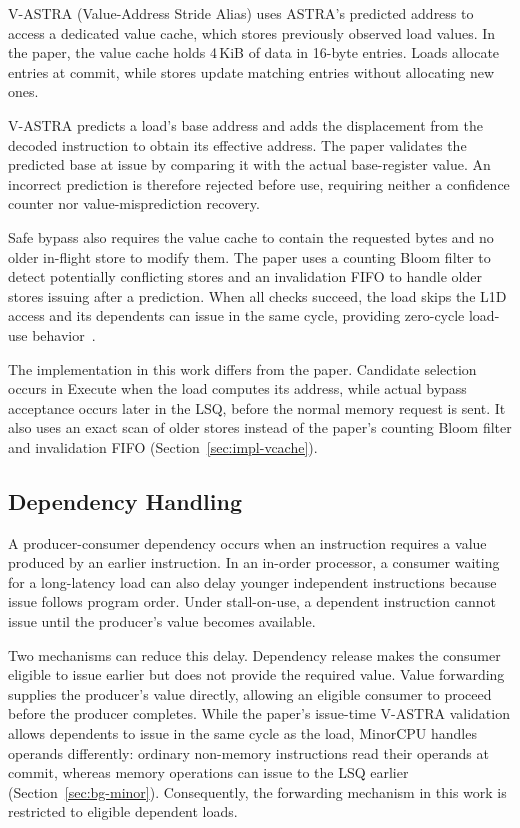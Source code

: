 V-ASTRA (Value-Address Stride Alias) uses ASTRA's predicted address
to access a dedicated value cache, which stores previously
observed load values. In the paper, the value cache holds 4\,KiB of data
in 16-byte entries. Loads allocate entries at commit, while stores
update matching entries without allocating new ones.

V-ASTRA predicts a load's base address and adds the displacement
from the decoded instruction to obtain its effective address.
The paper validates the predicted base at issue by comparing it
with the actual base-register value. An incorrect prediction is
therefore rejected before use, requiring neither a confidence
counter nor value-misprediction recovery.

Safe bypass also requires the value cache to contain the requested
bytes and no older in-flight store to modify them. The paper uses
a counting Bloom filter to detect potentially conflicting stores
and an invalidation FIFO to handle older stores issuing after a
prediction. When all checks succeed, the load skips the L1D access
and its dependents can issue in the same cycle, providing
zero-cycle load-use behavior~\cite{ravenel2025architecting}.

The implementation in this work differs from the paper. Candidate
selection occurs in Execute when the load computes its address,
while actual bypass acceptance occurs later in the LSQ, before
the normal memory request is sent. It also uses an exact scan of
older stores instead of the paper's counting Bloom filter and
invalidation FIFO (Section~\ref{sec:impl-vcache}).

\subsection{Dependency Handling}

A producer-consumer dependency occurs when an instruction requires
a value produced by an earlier instruction. In an in-order processor,
a consumer waiting for a long-latency load can also delay younger
independent instructions because issue follows program order. Under
stall-on-use, a dependent instruction cannot issue until the
producer's value becomes available.

Two mechanisms can reduce this delay. Dependency release
makes the consumer eligible to issue earlier but does not provide
the required value. Value forwarding supplies the producer's
value directly, allowing an eligible consumer to proceed before the
producer completes. While the paper's issue-time V-ASTRA validation
allows dependents to issue in the same cycle as the load, MinorCPU
handles operands differently: ordinary non-memory instructions read
their operands at commit, whereas memory operations can issue to
the LSQ earlier (Section~\ref{sec:bg-minor}). Consequently, the
forwarding mechanism in this work is restricted to eligible
dependent loads.

